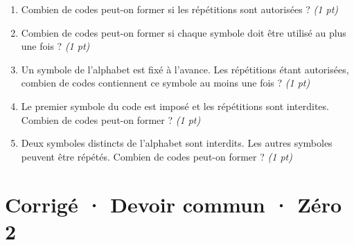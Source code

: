 \begin{enumerate}

\item Combien de codes peut-on former si les répétitions sont autorisées ? \hfill\textit{(1 pt)}

\item Combien de codes peut-on former si chaque symbole doit être utilisé au plus une fois ? \hfill\textit{(1 pt)}

\item Un symbole de l'alphabet est fixé à l'avance. Les répétitions étant autorisées, combien de codes contiennent ce symbole au moins une fois ? \hfill\textit{(1 pt)}

\item Le premier symbole du code est imposé et les répétitions sont interdites. Combien de codes peut-on former ? \hfill\textit{(1 pt)}

\item Deux symboles distincts de l'alphabet sont interdits. Les autres symboles peuvent être répétés. Combien de codes peut-on former ? \hfill\textit{(1 pt)}

\end{enumerate}

\ifmxteacher\mxnewpage

\section*{Corrigé · Devoir commun · Zéro 2}\label{cor:3-2}

